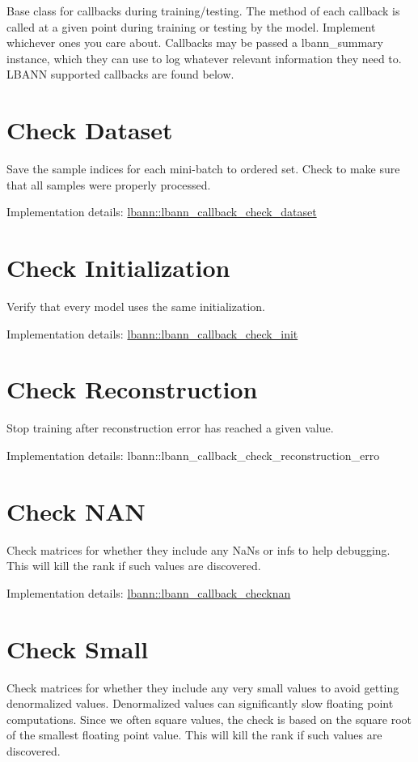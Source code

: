 Base class for callbacks during training/testing. The method of each callback is called at a given point during training or testing by the model. Implement whichever ones you care about. Callbacks may be passed a lbann\+\_\+summary instance, which they can use to log whatever relevant information they need to. L\+B\+A\+NN supported callbacks are found below.\hypertarget{callbacks_checkdata}{}\section{Check Dataset}\label{callbacks_checkdata}
Save the sample indices for each mini-\/batch to ordered set. Check to make sure that all samples were properly processed.

Implementation details\+: \hyperlink{classlbann_1_1lbann__callback__check__dataset}{lbann\+::lbann\+\_\+callback\+\_\+check\+\_\+dataset}\hypertarget{callbacks_checkinit}{}\section{Check Initialization}\label{callbacks_checkinit}
Verify that every model uses the same initialization.

Implementation details\+: \hyperlink{classlbann_1_1lbann__callback__check__init}{lbann\+::lbann\+\_\+callback\+\_\+check\+\_\+init}\hypertarget{callbacks_checkreconstruction}{}\section{Check Reconstruction}\label{callbacks_checkreconstruction}
Stop training after reconstruction error has reached a given value.

Implementation details\+: lbann\+::lbann\+\_\+callback\+\_\+check\+\_\+reconstruction\+\_\+erro\hypertarget{callbacks_checknan}{}\section{Check N\+AN}\label{callbacks_checknan}
Check matrices for whether they include any Na\+Ns or infs to help debugging. This will kill the rank if such values are discovered.

Implementation details\+: \hyperlink{classlbann_1_1lbann__callback__checknan}{lbann\+::lbann\+\_\+callback\+\_\+checknan}\hypertarget{callbacks_checksmall}{}\section{Check Small}\label{callbacks_checksmall}
Check matrices for whether they include any very small values to avoid getting denormalized values. Denormalized values can significantly slow floating point computations. Since we often square values, the check is based on the square root of the smallest floating point value. This will kill the rank if such values are discovered.

